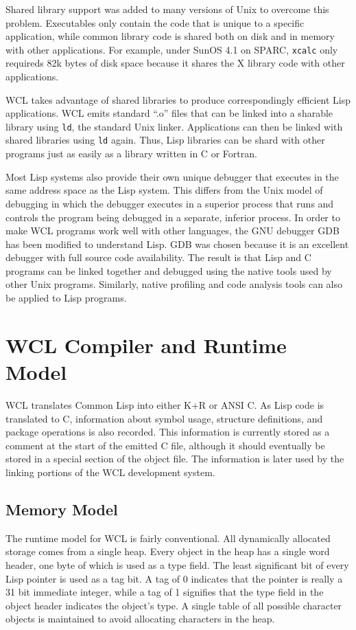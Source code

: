 Shared library support was added to many versions of Unix to overcome
this problem.  Executables only contain the code that is unique to a
specific application, while common library code is shared both on disk
and in memory with other applications.  For example, under SunOS 4.1
on SPARC, {\tt xcalc} only requireds 82k bytes of disk space because
it shares the X library code with other applications.

WCL takes advantage of shared libraries to produce correspondingly
efficient Lisp applications. WCL emits standard ``.o'' files that can be
linked into a sharable library using {\tt ld}, the standard Unix
linker. Applications can then be linked with shared libraries using
{\tt ld} again. Thus, Lisp libraries can be shard with other programs
just as easily as a library written in C or Fortran.

Most Lisp systems also provide their own unique debugger that executes
in the same address space as the Lisp system. This differs from the
Unix model of debugging in which the debugger executes in a superior
process that runs and controls the program being debugged in a
separate, inferior process.  In order to make WCL programs work well
with other languages, the GNU debugger GDB has been modified to
understand Lisp. GDB was chosen because it is an excellent debugger
with full source code availability. The result is that Lisp and C
programs can be linked together and debugged using the native tools
used by other Unix programs. Similarly, native profiling and code
analysis tools can also be applied to Lisp programs.

\section{WCL Compiler and Runtime Model}

WCL translates Common Lisp into either K+R or ANSI C. As Lisp code is
translated to C, information about symbol usage, structure
definitions, and package operations is also recorded. This
information is currently stored as a comment at the start of the emitted
C file, although it should  eventually be stored in a special section
of the object file. The information is later used by the linking
portions of the WCL development system.

\subsection{Memory Model}

The runtime model for WCL is fairly conventional.  All dynamically
allocated storage comes from a single heap.  Every object in the heap
has a single word header, one byte of which is used as a type field.
The least significant bit of every Lisp pointer is used as a
tag bit. A tag of 0 indicates that the pointer is really a 31 bit
immediate integer, while a tag of 1 signifies that the type field in
the object header indicates the object's type.  A single table
of all possible character objects is maintained to avoid allocating
characters in the heap.

